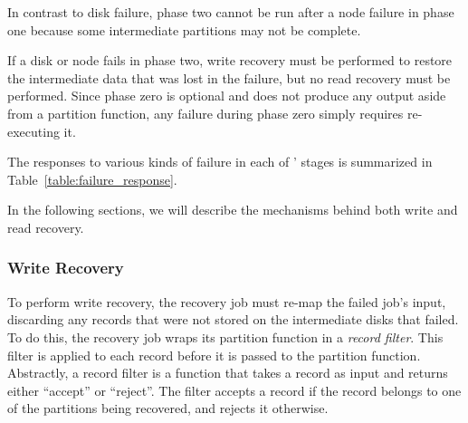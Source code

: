 \begin{table}[t]
  \centering
  \caption{\label{table:failure_response} Table summarizing \themis' response
    to various kinds of failures at different points in the job.}
\end{table}

In contrast to disk failure, phase two cannot be run after a node failure in
phase one because some intermediate partitions may not be complete.

If a disk or node fails in phase two, write recovery must be performed to
restore the intermediate data that was lost in the failure, but no read
recovery must be performed. Since phase zero is optional and does not produce
any output aside from a partition function, any failure during phase zero
simply requires re-executing it.

The responses to various kinds of failure in each of \themis' stages is
summarized in Table~\ref{table:failure_response}.

In the following sections, we will describe the mechanisms behind both write
and read recovery.

\subsubsection{Write Recovery}

To perform write recovery, the recovery job must re-map the failed job's input,
discarding any records that were not stored on the intermediate disks that
failed. To do this, the recovery job wraps its partition function in a
\emph{record filter}. This filter is applied to each record before it is passed
to the partition function. Abstractly, a record filter is a function that takes
a record as input and returns either ``accept'' or ``reject''. The filter
accepts a record if the record belongs to one of the partitions being
recovered, and rejects it otherwise.

